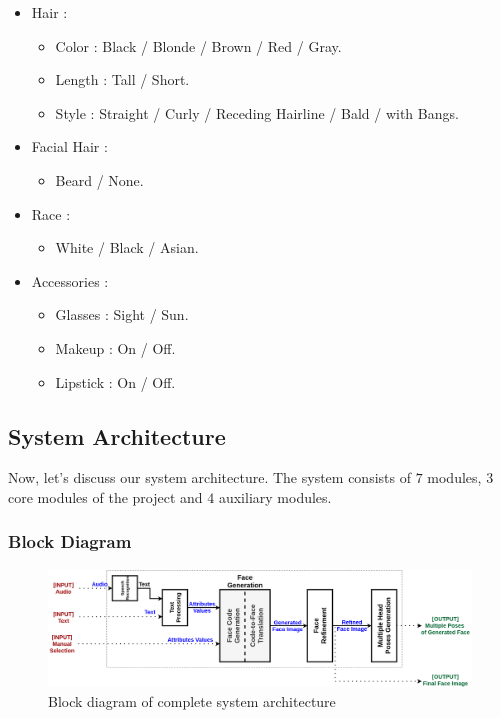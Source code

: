 \begin{itemize}
\begin{itemize}
    \end{itemize}
    \item Hair :
    \begin{itemize}
        \item Color : Black / Blonde / Brown / Red / Gray.
        \item Length : Tall / Short.
        \item Style : Straight / Curly / Receding Hairline / Bald / with Bangs.
    \end{itemize}
    \item Facial Hair :
    \begin{itemize}
        \item Beard / None.
    \end{itemize}
    \item Race :
    \begin{itemize}
        \item White / Black / Asian.
    \end{itemize}
    \item Accessories :
    \begin{itemize}
        \item Glasses : Sight / Sun.
        \item Makeup : On / Off.
        \item Lipstick : On / Off.
    \end{itemize}
\end{itemize}

\subsection{System Architecture}

Now, let's discuss our system architecture. The system consists of $7$ modules, $3$ core modules of the project and $4$ auxiliary modules.

\subsubsection{Block Diagram}

\begin{figure}[h]
    \centering
    \includegraphics[width=\textwidth]{images/system-design.png}
    \caption{Block diagram of complete system architecture}
    \label{fig:system}
\end{figure}

